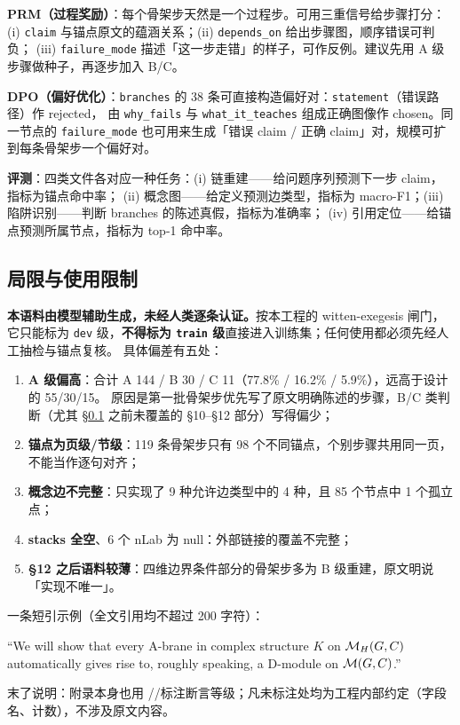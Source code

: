 \textbf{PRM（过程奖励）}：每个骨架步天然是一个过程步。可用三重信号给步骤打分：
(i) \texttt{claim} 与锚点原文的蕴涵关系；(ii) \texttt{depends\_on} 给出步骤图，顺序错误可判负；
(iii) \texttt{failure\_mode} 描述「这一步走错」的样子，可作反例。建议先用 A 级步骤做种子，再逐步加入 B/C。

\textbf{DPO（偏好优化）}：\texttt{branches} 的 38 条可直接构造偏好对：\texttt{statement}（错误路径）作 rejected，
由 \texttt{why\_fails} 与 \texttt{what\_it\_teaches} 组成正确图像作 chosen。同一节点的 \texttt{failure\_mode}
也可用来生成「错误 claim / 正确 claim」对，规模可扩到每条骨架步一个偏好对。

\textbf{评测}：四类文件各对应一种任务：(i) 链重建——给问题序列预测下一步 claim，指标为锚点命中率；
(ii) 概念图——给定义预测边类型，指标为 macro-F1；(iii) 陷阱识别——判断 branches 的陈述真假，指标为准确率；
(iv) 引用定位——给锚点预测所属节点，指标为 top-1 命中率。

\subsection{局限与使用限制}\label{sec:corpus-limit}

\begin{warn}
\textbf{本语料由模型辅助生成，未经人类逐条认证。}按本工程的 witten-exegesis 闸门，它只能标为
\texttt{dev} 级，\textbf{不得标为 \texttt{train} 级}直接进入训练集；任何使用都必须先经人工抽检与锚点复核。
具体偏差有五处：
\begin{enumerate}[label=(\arabic*)]
\item \textbf{A 级偏高}：合计 A 144 / B 30 / C 11（77.8\% / 16.2\% / 5.9\%），远高于设计的 55/30/15。
  原因是第一批骨架步优先写了原文明确陈述的步骤，B/C 类判断（尤其 \S\ref{sec:corpus-limit} 之前未覆盖的
  §10--§12 部分）写得偏少；
\item \textbf{锚点为页级/节级}：119 条骨架步只有 98 个不同锚点，个别步骤共用同一页，不能当作逐句对齐；
\item \textbf{概念边不完整}：只实现了 9 种允许边类型中的 4 种，且 85 个节点中 1 个孤立点；
\item \textbf{stacks 全空}、6 个 nLab 为 null：外部链接的覆盖不完整；
\item \textbf{§12 之后语料较薄}：四维边界条件部分的骨架步多为 B 级重建，原文明说「实现不唯一」。
\end{enumerate}
\end{warn}

一条短引示例（全文引用均不超过 200 字符）：

\begin{origquote}
``We will show that every A-brane in complex structure $K$ on $\mathcal{M}_H(G,C)$ automatically gives rise to, roughly speaking, a D-module on $\mathcal{M}(G,C)$.''
\end{origquote}

末了说明：附录本身也用 \pA/\pB/\pC 标注断言等级；凡未标注处均为工程内部约定（字段名、计数），不涉及原文内容。
